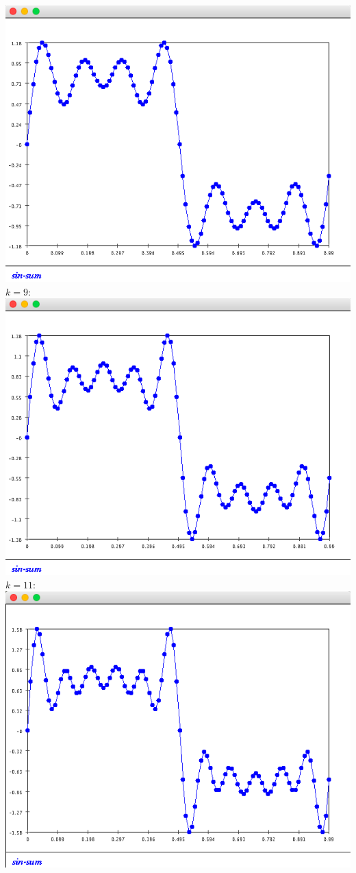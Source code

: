 \documentclass{article}
\begin{document}
\begin{enumerate}
\includegraphics[scale=0.3]{exercise5_k7}\\
$k=9:$ \\
\includegraphics[scale=0.3]{exercise5_k9}\\
$k=11:$ \\
\includegraphics[scale=0.3]{exercise5_k11}


\end{enumerate}
\end{document}
